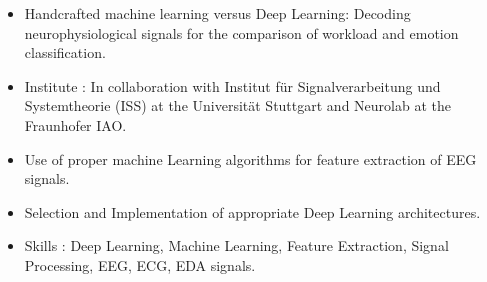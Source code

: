 \documentclass[10pt,a4paper,ragged2e]{altacv}
\begin{document}

\begin{fullwidth}
\makecvheader
\end{fullwidth}





\begin{itemize}
\item Handcrafted machine learning versus Deep Learning: Decoding neurophysiological signals for the comparison of workload and emotion classification.

\item Institute : In collaboration with Institut für Signalverarbeitung und Systemtheorie (ISS) at the Universität Stuttgart and Neurolab at the Fraunhofer IAO.
\item Use of proper machine Learning algorithms for feature extraction of EEG signals.
\item Selection and Implementation of appropriate Deep Learning architectures.
\item Skills : Deep Learning, Machine Learning, Feature Extraction, Signal Processing, EEG, ECG, EDA signals.

\divider

\end{itemize}
\end{document}
